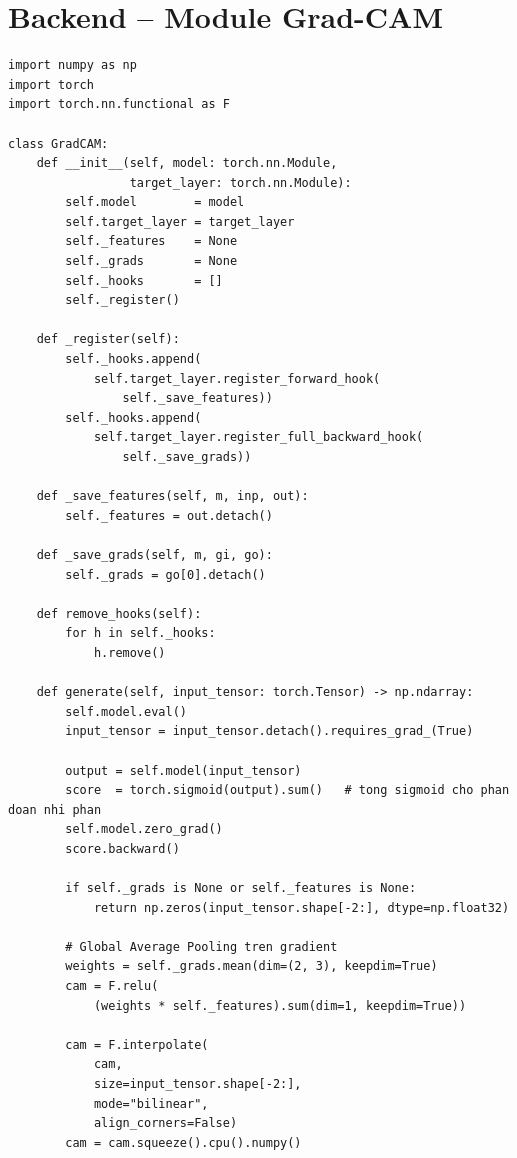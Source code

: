 \section{Backend -- Module Grad-CAM}

\begin{lstlisting}[style=codePython, caption={Trien khai Grad-CAM voi PyTorch forward/backward hooks }]
import numpy as np
import torch
import torch.nn.functional as F

class GradCAM:
    def __init__(self, model: torch.nn.Module,
                 target_layer: torch.nn.Module):
        self.model        = model
        self.target_layer = target_layer
        self._features    = None
        self._grads       = None
        self._hooks       = []
        self._register()

    def _register(self):
        self._hooks.append(
            self.target_layer.register_forward_hook(
                self._save_features))
        self._hooks.append(
            self.target_layer.register_full_backward_hook(
                self._save_grads))

    def _save_features(self, m, inp, out):
        self._features = out.detach()

    def _save_grads(self, m, gi, go):
        self._grads = go[0].detach()

    def remove_hooks(self):
        for h in self._hooks:
            h.remove()

    def generate(self, input_tensor: torch.Tensor) -> np.ndarray:
        self.model.eval()
        input_tensor = input_tensor.detach().requires_grad_(True)

        output = self.model(input_tensor)
        score  = torch.sigmoid(output).sum()   # tong sigmoid cho phan doan nhi phan
        self.model.zero_grad()
        score.backward()

        if self._grads is None or self._features is None:
            return np.zeros(input_tensor.shape[-2:], dtype=np.float32)

        # Global Average Pooling tren gradient
        weights = self._grads.mean(dim=(2, 3), keepdim=True)
        cam = F.relu(
            (weights * self._features).sum(dim=1, keepdim=True))

        cam = F.interpolate(
            cam,
            size=input_tensor.shape[-2:],
            mode="bilinear",
            align_corners=False)
        cam = cam.squeeze().cpu().numpy()


\end{lstlisting}
